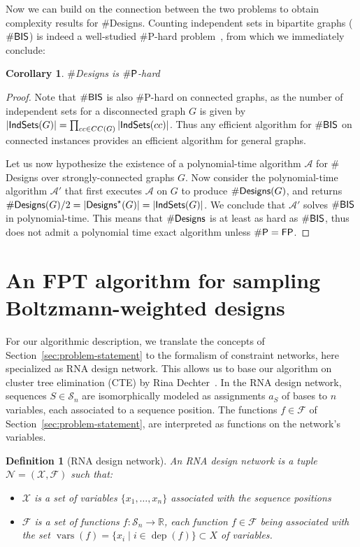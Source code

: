 \documentclass{bioinfo}
\newtheorem{definition}[theorem]{Definition}
\newtheorem{corollary}[theorem]{Corollary}
\newcommand{\network}{\mathcal{N}}
\newcommand{\val}{a} %
\newcommand{\vars}{\operatorname{vars}}
\newcommand{\dep}{\operatorname{dep}}
\newcommand{\real}{\mathbb{R}}
\newcommand{\F}{\mathcal{F}}
\renewcommand{\S}{\mathcal{S}}
\newcommand{\X}{\mathcal{X}}
\newcommand{\Def}[1]{{\it #1}}
\newcommand{\Design}[1]{{\sf Designs}^{\star}(#1)}
\newcommand{\NumDesign}{\ensuremath{\#}{\sf Designs}\xspace}
\newcommand{\IS}[1]{{\sf IndSets}(#1)}
\begin{document}
Now we can build on the connection between the two problems to obtain complexity results for \NumDesign. Counting independent sets in bipartite graphs ($\#{\sf BIS}$) is indeed a well-studied \#{\sf P}-hard problem~\cite{Ge2012}, from which we immediately conclude:
\begin{corollary}
  \NumDesign is $\#{\sf P}$-hard
\end{corollary}
\begin{proof}
  Note that $\#{\sf BIS}$ is also \#{\sf P}-hard on connected graphs, as the number of independent sets for a disconnected graph $G$ is given by $|\IS{G}|=\prod_{cc\in CC(G)} |\IS{cc}|$. Thus any efficient algorithm for $\#{\sf BIS}$ on connected instances provides an efficient algorithm for general graphs.
  
  Let us now hypothesize the existence of a polynomial-time algorithm $\mathcal{A}$ for \NumDesign over strongly-connected graphs $G$. Now consider the polynomial-time algorithm $\mathcal{A}'$ that first executes $\mathcal{A}$ on $G$ to produce $\NumDesign(G)$, and returns $\NumDesign(G)/2=|\Design{G}| = |\IS{G}|$. We conclude that $\mathcal{A}'$ solves $\#{\sf BIS}$ in polynomial-time. This means that $\NumDesign$  is at least as hard as $\#{\sf BIS}$, thus does not admit a polynomial time exact algorithm unless $\#{\sf P}={\sf FP}$.
\end{proof}

\section{An FPT algorithm for sampling Boltzmann-weighted designs}
\label{sec:FPT}

For our algorithmic description, we translate the concepts of
Section~\ref{sec:problem-statement} to the formalism of constraint networks, here
specialized as RNA design network. This allows us to base our
algorithm on cluster tree elimination (CTE) by Rina
Dechter~\cite{Dechter2013}.
%
In the RNA design network, sequences $S\in\S_n$ are isomorphically
modeled as assignments $\val_S$ of bases to $n$ variables, each associated to
a sequence position. The functions $f\in\F$ of
Section~\ref{sec:problem-statement}, are interpreted as functions on the network's variables.

\begin{definition}[RNA design network]
An \Def{RNA design network} is a tuple $\network=(\X,\F)$ such that:
\begin{itemize}
\item $\X$ is a set of \Def{variables} $\{x_1,\dots,x_n\}$ associated with the sequence positions
\item $\F$ is a set of \Def{functions} $f:\S_n\to\real$, each function $f\in \F$ being associated with the set $\vars(f)=\{x_i\mid i\in\dep(f) \}\subset X$ of variables.
\end{itemize}
\end{definition}
\end{document}
